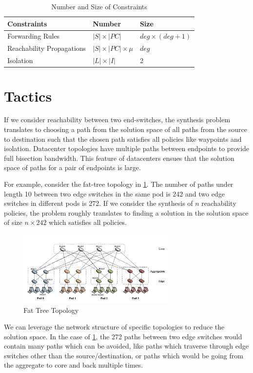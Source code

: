 \documentclass[]{sig}
\begin{document}
\begin{table}[H]
\begin{center}
	\begin{tabular}{||m{6em} | m{7em} | m{7em} ||} 
		\hline
		Constraints & Number & Size \\ [0.5ex] 
		\hline\hline
		Forwarding Rules & $|S| \times |PC| $ & $deg \times (deg + 1)$ \\ [0.5ex] 
		\hline
		Reachability Propagations & $|S| \times |PC| \times \mu $ & $deg$ \\ [0.5ex] 
		\hline
		Isolation & $|L| \times |I|$ & 2 \\
		\hline
	\end{tabular}
\end{center}
\caption{Number and Size of Constraints} \label{tab:title} 
\end{table}

\section{Tactics}
If we consider reachability between two end-switches, the synthesis problem translates to choosing a path from the solution space of all paths from the source to destination such that the chosen path satisfies all policies like waypoints and isolation. Datacenter topologies have multiple paths between endpoints to provide full bisection bandwidth. This feature of datacenters ensues that the solution space of paths for a pair of endpoints is large. 

For example, consider the fat-tree topology in \cref{fattree}. The number of paths under length 10 between two edge  switches in the same pod is 242 and two edge switches in different pods is 272. If we consider the synthesis of $n$ reachability policies, the problem roughly translates to finding a solution in the solution space of size $n \times 242$ which satisfies all policies. 
\begin{figure}[H]
	\includegraphics[width=8cm]{fattree.png}
	\caption{Fat Tree Topology}
	\label{fattree}
\end{figure}
We can leverage the network structure of specific topologies to reduce the solution space. In the case of \cref{fattree}, the 272 paths between two edge switches would contain many paths which can be avoided, like paths which traverse through edge switches other than the source/destination, or paths which would be  going from the aggregate to core and back multiple times. 
\end{document}
